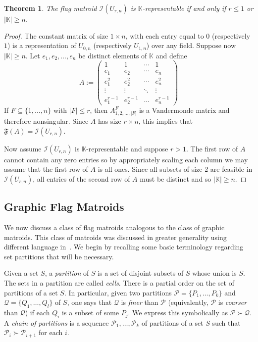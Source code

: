 \documentclass[12pt]{article}
\newtheorem{thm}{Theorem}[section]
\theoremstyle{definition}
\begin{document}
\begin{thm}\label{thm: uniform flag matroids representability}
    The flag matroid $\mathcal{I}(U_{r,n})$ is $\mathbb{K}$-representable if and only if $r\leq 1$ or $|\mathbb{K}| \geq n$.
\end{thm}
\begin{proof}
    The constant matrix of size $1\times n$, with each entry equal to $0$ (respectively $1$) is a representation of $U_{0,n}$ (respectively $U_{1,n}$) over any field.
    Suppose now $|\mathbb{K}| \geq n$.
    Let $e_1, e_2, \dots, e_n$ be distinct elements of $\mathbb{K}$ and define 
    \begin{equation*}
        A := \begin{pmatrix}
            1 & 1 & \cdots & 1 \\
            e_1 & e_2 & \cdots & e_n \\
            e_1^2 & e_2^2 & \cdots & e_n^2 \\
            \vdots & \vdots & \ddots & \vdots \\
            e_1^{r-1} & e_2^{r-1} & \dots & e_n^{r-1}
        \end{pmatrix}
    \end{equation*}
    If $F \subseteq \{1,\dots,n\}$ with $|F| \le r$,
    then $A_{1, 2, \dots, |F|}^F$ is a Vandermonde matrix and therefore nonsingular.
    Since $A$ has size $r\times n$, this implies that $\mathfrak{F}(A) = \mathcal{I}(U_{r,n})$.

    Now assume $\mathcal{I}(U_{r,n})$ is $\mathbb{K}$-representable and suppose $r > 1$.
    The first row of $A$ cannot contain any zero entries
    so by appropriately scaling each column we may assume that the first row of $A$ is all ones.
    Since all subsets of size 2 are feasible in $\mathcal{I}(U_{r,n})$,
    all entries of the second row of $A$ must be distinct and so $|\mathbb{K}| \ge n$.
\end{proof}


\subsection{Graphic Flag Matroids}
We now discuss a class of flag matroids analogous to the class of graphic matroids.
This class of matroids was discussed in greater generality using different language in~\cite[Section~7.4]{white1986theory}.
We begin by recalling some basic terminology regarding set partitions that will be necessary.

Given a set $S$, a \emph{partition} of $S$ is a set of disjoint subsets of $S$ whose union is $S$.
The sets in a partition are called \emph{cells}.
There is a partial order on the set of partitions of a set $S$.
In particular, given two partitions $\mathcal{P} = \{P_1,\dots,P_k\}$ and $\mathcal{Q} = \{Q_1,\dots,Q_l\}$ of $S$,
one says that $\mathcal{Q}$ is \emph{finer} than $\mathcal{P}$ (equivalently, $\mathcal{P}$ is \emph{coarser} than $\mathcal{Q}$)
if each $Q_i$ is a subset of some $P_j$.
We express this symbolically as $\mathcal{P} \succ \mathcal{Q}$.
A \emph{chain of partitions} is a sequence $\mathcal{P}_1,\dots,\mathcal{P}_k$ of partitions of a set $S$
such that $\mathcal{P}_i \succ \mathcal{P}_{i+1}$ for each $i$.
\end{document}
